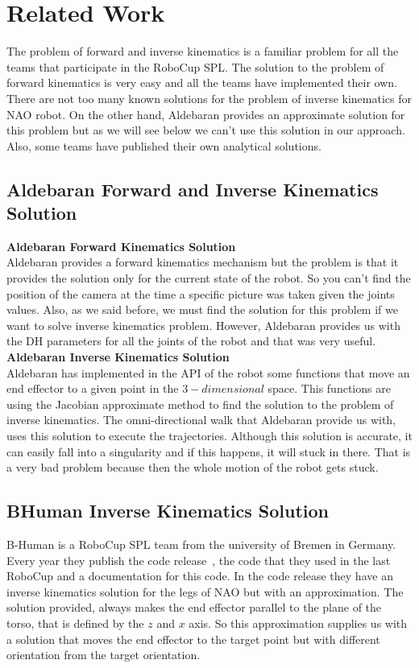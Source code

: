 \chapter{Related Work}
\label{related}
The problem of forward and inverse kinematics is a familiar problem for all the teams that participate in the RoboCup SPL. The solution to the problem of forward kinematics is very easy and all the teams have implemented their own. There are not too many known solutions for the problem of inverse kinematics for NAO robot. On the other hand, Aldebaran provides an approximate solution for this problem but as we will see below we can't use this solution in our approach. Also, some teams have published their own analytical solutions.
\section{Aldebaran Forward and Inverse Kinematics Solution}
\textbf{Aldebaran Forward Kinematics Solution}\\
Aldebaran provides a forward kinematics mechanism but the problem is that it provides the solution only for the current state of the robot. So you can't find the position of the camera at the time a specific picture was taken given the joints values. Also, as we said before, we must find the solution for this problem if we want to solve inverse kinematics problem. However, Aldebaran provides us with the DH parameters for all the joints of the robot and that was very useful.\\ 
\textbf{Aldebaran Inverse Kinematics Solution}\\
Aldebaran has implemented in the API of the robot some functions that move an end effector to a given point in the \(3-dimensional\) space. This functions are using the Jacobian approximate method to find the solution to the problem of inverse kinematics. The omni-directional walk that Aldebaran provide us with, uses this solution to execute the trajectories. Although this solution is accurate, it can easily fall into a singularity and if this happens, it will stuck in there. That is a very bad problem because then the whole motion of the robot gets stuck.
\section{BHuman Inverse Kinematics Solution}
B-Human is a RoboCup SPL team from the university of Bremen in Germany. Every year they publish the code release~\cite{bhuman}, the code that they used in the last RoboCup and a documentation for this code. In the code release they have an inverse kinematics solution for the legs of NAO but with an approximation. The solution provided, always makes the end effector parallel to the plane of the torso, that is defined by the \(z\) and \(x\) axis. So this approximation supplies us with a solution that moves the end effector to the target point but with different orientation from the target orientation.
